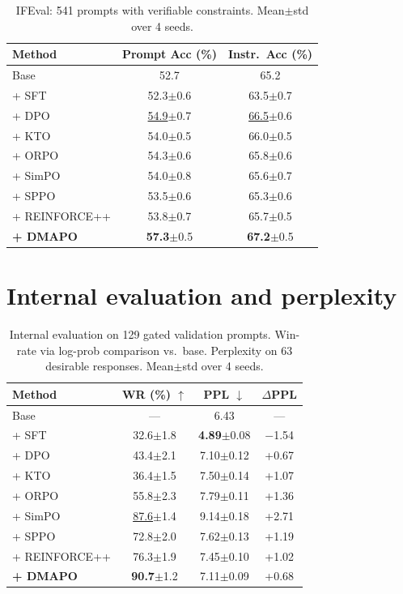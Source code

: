 \documentclass{article}
\newcommand{\res}[2]{#1{\scriptsize$\pm$#2}}
\begin{document}
\begin{table}[h]
\centering
\caption{IFEval: 541 prompts with verifiable constraints. Mean$\pm$std over 4 seeds.}
\vspace{0.5em}
\begin{tabular}{l cc}
\toprule
\textbf{Method} & \textbf{Prompt Acc (\%)} & \textbf{Instr.\ Acc (\%)} \\
\midrule
Base & 52.7 & 65.2 \\
+ SFT & \res{52.3}{0.6} & \res{63.5}{0.7} \\
+ DPO & \res{\underline{54.9}}{0.7} & \res{\underline{66.5}}{0.6} \\
+ KTO & \res{54.0}{0.5} & \res{66.0}{0.5} \\
+ ORPO & \res{54.3}{0.6} & \res{65.8}{0.6} \\
+ SimPO & \res{54.0}{0.8} & \res{65.6}{0.7} \\
+ SPPO & \res{53.5}{0.6} & \res{65.3}{0.6} \\
+ REINFORCE++ & \res{53.8}{0.7} & \res{65.7}{0.5} \\
\midrule
\textbf{+ DMAPO} & \res{\textbf{57.3}}{0.5} & \res{\textbf{67.2}}{0.5} \\
\bottomrule
\end{tabular}
\end{table}

\section{Internal evaluation and perplexity}
\label{app:internal}

\begin{table}[h]
\centering
\caption{Internal evaluation on 129 gated validation prompts. Win-rate via log-prob comparison vs.\ base. Perplexity on 63 desirable responses. Mean$\pm$std over 4 seeds.}
\label{tab:internal}
\vspace{0.5em}
\begin{tabular}{l cc c}
\toprule
\textbf{Method} & \textbf{WR (\%)} $\uparrow$ & \textbf{PPL} $\downarrow$ & \textbf{$\Delta$PPL} \\
\midrule
Base  & --- & 6.43 & --- \\
+ SFT & \res{32.6}{1.8} & \res{\textbf{4.89}}{0.08} & $-$1.54 \\
+ DPO & \res{43.4}{2.1} & \res{7.10}{0.12} & +0.67 \\
+ KTO & \res{36.4}{1.5} & \res{7.50}{0.14} & +1.07 \\
+ ORPO & \res{55.8}{2.3} & \res{7.79}{0.11} & +1.36 \\
+ SimPO & \res{\underline{87.6}}{1.4} & \res{9.14}{0.18} & +2.71 \\
+ SPPO & \res{72.8}{2.0} & \res{7.62}{0.13} & +1.19 \\
+ REINFORCE++ & \res{76.3}{1.9} & \res{7.45}{0.10} & +1.02 \\
\midrule
\textbf{+ DMAPO} & \res{\textbf{90.7}}{1.2} & \res{7.11}{0.09} & +0.68 \\
\bottomrule
\end{tabular}
\end{table}
\end{document}
